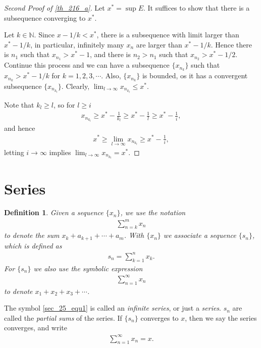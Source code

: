 \documentclass[11pt]{book}
\newtheorem{definition}{Definition}[chapter]
\theoremstyle{definition}
\numberwithin{equation}{chapter}
\begin{document}
\begin{proof}[Second Proof of \ref{th_216_a}]
Let $x^* = \sup E$. It suffices to show that there is a subsequence converging to $x^*$. 

Let $k \in \mathbb{N}$. Since $x - 1/k < x^*$, there is a subsequence with limit larger than $x^* - 1/k$, in particular, infinitely many $x_n$ are larger than $x^* - 1/k$. Hence there is $n_1$ such that $x_{n_1} > x^* - 1$, and there is $n_2 > n_1$ such that $x_{n_2} > x^* - 1/2$. Continue this process and we can have a subsequence $\{x_{n_k}\}$ such that $x_{n_k} > x^* - 1/k$ for $k = 1,2,3,\cdots$. Also, $\{x_{n_k}\}$ is bounded, os it has a convergent subsequence $\{x_{n_{k_l}}\}$. Clearly, $\lim_{l\to\infty} x_{n_{k_l}} \leq x^*$. 

Note that $k_l \geq l$, so for $l \geq i$
\begin{align*}
    x_{n_{k_l}} \geq x^* - \frac{1}{k_l} \geq x^* - \frac{1}{l} \geq x^* - \frac{1}{i},
\end{align*}
and hence
\begin{align*}
    x^* \geq \lim_{l\to\infty} x_{n_{k_l}} \geq x^* - \frac{1}{i},
\end{align*}
letting $i \to \infty$ implies $\lim_{l\to\infty} x_{n_{k_l}} = x^*$.
\end{proof}



\medskip


\section{Series}

\begin{definition}
Given a sequence $\{x_n\}$, we use the notation
\begin{align*}
    \sum^m_{n=k} x_n
\end{align*}
to denote the sum $x_k + a_{k+1} + \cdots + a_m$. With $\{x_n\}$ we associate a sequence $\{s_n\}$, which is defined as
\begin{align*}
    s_n = \sum^n_{k=1} x_k.
\end{align*}
For $\{s_n\}$ we also use the symbolic expression 
\begin{align}\label{sec_25_equ1}
    \sum^\infty_{n=1} x_n
\end{align}
to denote $x_1 + x_2 + x_3 + \cdots$.
\end{definition}

The symbol \eqref{sec_25_equ1} is called an {\em infinite series}, or just a {\em series}. $s_n$ are called the {\em partial sums} of the series. If $\{s_n\}$ converges to $x$, then we say the series converges, and write
\begin{align*}
    \sum^\infty_{n=1} x_n = x.
\end{align*}
\end{document}
